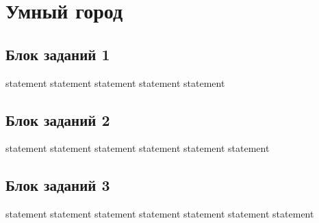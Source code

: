 \chapter{Умный город}

\section{Блок заданий 1}

{statement}
{statement}
{statement}
{statement}
{statement}

\section{Блок заданий 2}

{statement}
{statement}
{statement}
{statement}
{statement}
{statement}

\section{Блок заданий 3}

{statement}
{statement}
{statement}
{statement}
{statement}
{statement}
{statement}